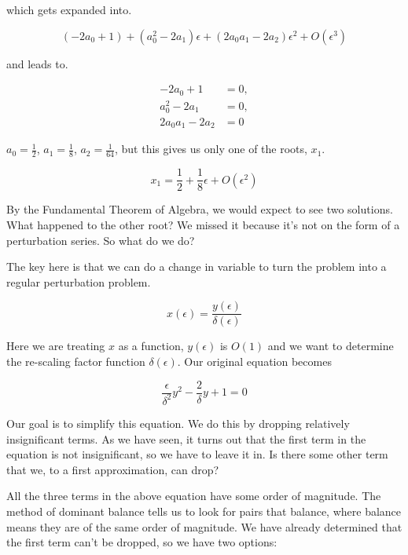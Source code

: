 \documentclass[12pt]{article}
\begin{document}
which gets expanded into.

\begin{equation}
(- 2 a_0 + 1) + (a_0^2 - 2 a_1) \epsilon + (2 a_0 a_1 -2 a_2) \epsilon^2 +
O(\epsilon^3)
\end{equation}

and leads to.

\begin{align}
- 2 a_0 + 1 &= 0, \\
a_0^2 - 2 a_1 &= 0, \\
2 a_0 a_1 -2 a_2 &= 0
\end{align}

$a_0 = \frac{1}{2}$, $a_1=\frac{1}{8}$, $a_2= \frac{1}{64}$, but this gives us
only one of the roots, $x_1$.

\begin{equation}
x_1 = \frac{1}{2} + \frac{1}{8} \epsilon + O(\epsilon^2)
\end{equation}

By the Fundamental Theorem of Algebra, we would expect to see two solutions.
What happened to the other root? We missed it because it's not on the form of
a perturbation series. So what do we do?

The key here is that we can do a change in variable to turn the problem into a
regular perturbation problem.

\begin{equation}
x(\epsilon) = \frac{y(\epsilon)}{\delta(\epsilon)}
\end{equation}

Here we are treating $x$ as a function, $y(\epsilon)$ is $O(1)$ and we want to
determine the re-scaling factor function $\delta(\epsilon)$. Our original
equation becomes

\begin{equation}
\frac{\epsilon}{\delta^2} y^2 - \frac{2}{\delta} y + 1 = 0
\end{equation}

Our goal is to simplify this equation. We do this by dropping relatively
insignificant terms. As we have seen, it turns out that the first term in the
equation is not insignificant, so we have to leave it in. Is there some other
term that we, to a first approximation, can drop?

All the three terms in the above equation have some order of magnitude. The method
of dominant balance tells us to look for pairs that balance, where balance means
they are of the same order of magnitude. We have already determined that the
first term can't be dropped, so we have two options:
\end{document}
